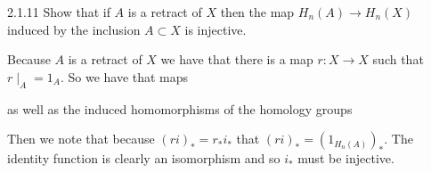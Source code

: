 \documentclass{article}
\begin{document}
\begin{exercise}{2.1.11}{\parindent}
  Show that if $A$ is a retract of $X$ then the map $H_n(A) \to
  H_n(X)$ induced by the inclusion $A \subset X$ is injective.
\end{exercise}
\begin{solution}{\parindent}
  Because $A$ is a retract of $X$ we have that there is a map $r: X
  \to X$ such that $r\mid_A = 1_A$. So we have that maps
  \begin{center}
  \end{center}
  as well as the induced homomorphisms of the homology groups
  \begin{center}
  \end{center}
  Then we note that because $(ri)_\ast = r_\ast i_\ast$ that
  $(ri)_\ast = (1_{H_n(A)})_\ast$. The identity function is clearly an
  isomorphism and so $i_\ast$ must be injective.
\end{solution}
\end{document}
